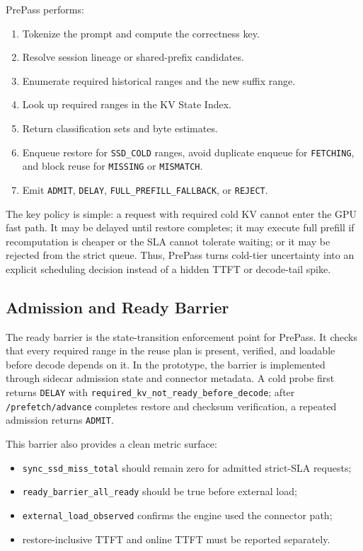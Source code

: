 \documentclass[sigconf,review,anonymous]{acmart}
\begin{document}
PrePass performs:
\begin{enumerate}[leftmargin=*]
  \item Tokenize the prompt and compute the correctness key.
  \item Resolve session lineage or shared-prefix candidates.
  \item Enumerate required historical ranges and the new suffix range.
  \item Look up required ranges in the KV State Index.
  \item Return classification sets and byte estimates.
  \item Enqueue restore for \texttt{SSD\_COLD} ranges, avoid duplicate enqueue
  for \texttt{FETCHING}, and block reuse for \texttt{MISSING} or
  \texttt{MISMATCH}.
  \item Emit \texttt{ADMIT}, \texttt{DELAY},
  \texttt{FULL\_PREFILL\_FALLBACK}, or \texttt{REJECT}.
\end{enumerate}

The key policy is simple: a request with required cold KV cannot enter the GPU
fast path. It may be delayed until restore completes; it may execute full
prefill if recomputation is cheaper or the SLA cannot tolerate waiting; or it
may be rejected from the strict queue. Thus, PrePass turns cold-tier uncertainty
into an explicit scheduling decision instead of a hidden TTFT or decode-tail
spike.

\subsection{Admission and Ready Barrier}

The ready barrier is the state-transition enforcement point for PrePass. It
checks that every required range in the reuse plan is present, verified, and
loadable before decode depends on it. In the prototype, the barrier is
implemented through sidecar admission state and connector metadata. A cold probe
first returns
\texttt{DELAY} with \texttt{required\_kv\_not\_ready\_before\_decode}; after
\texttt{/prefetch/advance} completes restore and checksum verification, a
repeated admission returns \texttt{ADMIT}.

This barrier also provides a clean metric surface:
\begin{itemize}[leftmargin=*]
  \item \texttt{sync\_ssd\_miss\_total} should remain zero for admitted
  strict-SLA requests;
  \item \texttt{ready\_barrier\_all\_ready} should be true before external
  load;
  \item \texttt{external\_load\_observed} confirms the engine used the
  connector path;
  \item restore-inclusive TTFT and online TTFT must be reported separately.
\end{itemize}
\end{document}
